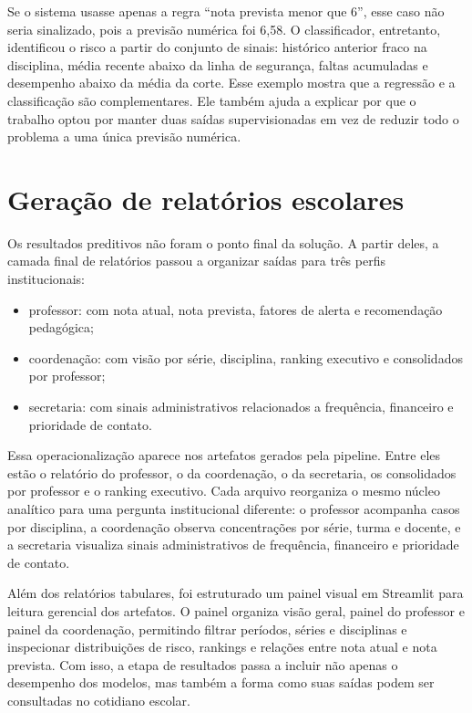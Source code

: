 Se o sistema usasse apenas a regra ``nota prevista menor que 6'', esse caso n\~ao seria sinalizado, pois a previs\~ao num\'erica foi 6,58. O classificador, entretanto, identificou o risco a partir do conjunto de sinais: hist\'orico anterior fraco na disciplina, m\'edia recente abaixo da linha de seguran\c{c}a, faltas acumuladas e desempenho abaixo da m\'edia da corte. Esse exemplo mostra que a regress\~ao e a classifica\c{c}\~ao s\~ao complementares. Ele tamb\'em ajuda a explicar por que o trabalho optou por manter duas sa\'idas supervisionadas em vez de reduzir todo o problema a uma \'unica previs\~ao num\'erica.

\section{Gera\c{c}\~ao de relat\'orios escolares}
\label{sec:relatorios}

Os resultados preditivos n\~ao foram o ponto final da solu\c{c}\~ao. A partir deles, a camada final de relat\'orios passou a organizar sa\'idas para tr\^es perfis institucionais:
\begin{itemize}
    \item professor: com nota atual, nota prevista, fatores de alerta e recomenda\c{c}\~ao pedag\'ogica;
    \item coordena\c{c}\~ao: com vis\~ao por s\'erie, disciplina, ranking executivo e consolidados por professor;
    \item secretaria: com sinais administrativos relacionados a frequ\^encia, financeiro e prioridade de contato.
\end{itemize}

Essa operacionaliza\c{c}\~ao aparece nos artefatos gerados pela pipeline. Entre eles est\~ao o relat\'orio do professor, o da coordena\c{c}\~ao, o da secretaria, os consolidados por professor e o ranking executivo. Cada arquivo reorganiza o mesmo n\'ucleo anal\'itico para uma pergunta institucional diferente: o professor acompanha casos por disciplina, a coordena\c{c}\~ao observa concentra\c{c}\~oes por s\'erie, turma e docente, e a secretaria visualiza sinais administrativos de frequ\^encia, financeiro e prioridade de contato.

Al\'em dos relat\'orios tabulares, foi estruturado um painel visual em Streamlit para leitura gerencial dos artefatos. O painel organiza vis\~ao geral, painel do professor e painel da coordena\c{c}\~ao, permitindo filtrar per\'iodos, s\'eries e disciplinas e inspecionar distribui\c{c}\~oes de risco, rankings e rela\c{c}\~oes entre nota atual e nota prevista. Com isso, a etapa de resultados passa a incluir n\~ao apenas o desempenho dos modelos, mas tamb\'em a forma como suas sa\'idas podem ser consultadas no cotidiano escolar.

